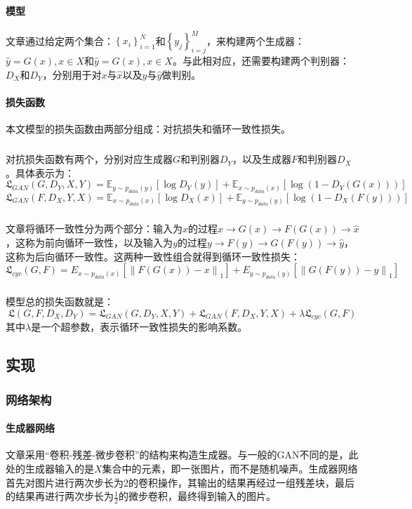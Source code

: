 \documentclass[12pt,a4paper]{article}
\begin{document}
\paragraph{模型} 文章通过给定两个集合：${\left \{x_i \right \}}^N_{i=1}$和${\left \{y_j \right \}}^M_{i=j}$，来构建两个生成器：$ \hat y = G(x), x \in X $和$ \hat y = G(x), x \in X $。与此相对应，还需要构建两个判别器：$D_X$和$D_Y$，分别用于对$x$与$\hat x$以及$y$与$\hat y$做判别。
\paragraph{损失函数} 本文模型的损失函数由两部分组成：对抗损失和循环一致性损失。
	\subparagraph{} 对抗损失函数有两个，分别对应生成器$G$和判别器$D_Y$，以及生成器$F$和判别器$D_X$。具体表示为：
	\begin{equation}
		\mathfrak{L}_{GAN}(G, D_Y, X, Y) = \mathbb{E}_{y \sim p_{data}(y)}[\log D_Y(y)] + \mathbb{E}_{x \sim p_{data}(x)}[\log(1 - D_Y(G(x)))]
	\end{equation}
	\begin{equation}
		\mathfrak{L}_{GAN}(F, D_X, Y, X) = \mathbb{E}_{x \sim p_{data}(x)}[\log D_X(x)] + \mathbb{E}_{y \sim p_{data}(y)}[\log(1 - D_X(F(y)))]
	\end{equation}
	\subparagraph{} 文章将循环一致性分为两个部分：输入为$x$的过程$x \rightarrow G(x) \rightarrow F(G(x)) \rightarrow \hat x$，这称为前向循环一致性，以及输入为$y$的过程$y \rightarrow F(y) \rightarrow G(F(y)) \rightarrow \hat y$，这称为后向循环一致性。这两种一致性组合就得到循环一致性损失：
	\begin{equation}
		\mathfrak{L}_{cyc}(G, F) = E_{x \sim p_{data}(x)}[\left \| F(G(x)) - x \right \|_1] + E_{y \sim p_{data}(y)}[\left \| G(F(y)) - y \right \|_1]
	\end{equation}
	\subparagraph{} 模型总的损失函数就是：
	\begin{equation}
		\mathfrak{L}(G,F,D_X,D_Y)=\mathfrak{L}_{GAN}(G, D_Y, X, Y)+\mathfrak{L}_{GAN}(F, D_X, Y, X)+\lambda\mathfrak{L}_{cyc}(G, F)
	\end{equation}
	其中$\lambda$是一个超参数，表示循环一致性损失的影响系数。
	
\subsection{实现}
	\subsubsection{网络架构}
	\paragraph{生成器网络} 文章采用“卷积-残差-微步卷积”\cite{johnson2016perceptual}的结构来构造生成器。与一般的GAN不同的是，此处的生成器输入的是$X$集合中的元素，即一张图片，而不是随机噪声。生成器网络首先对图片进行两次步长为2的卷积操作，其输出的结果再经过一组残差块，最后的结果再进行两次步长为$\frac{1}{2}$的微步卷积，最终得到输入的图片。
\end{document}
